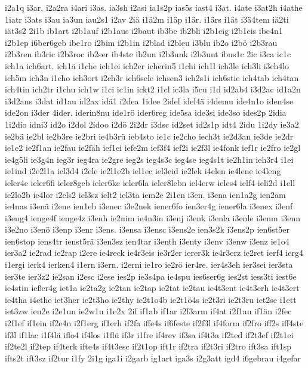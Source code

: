 {i2a1q
i3ar.
i2a2ra
i4ari
i3as.
ia3sh
i2asi
ia1s2p
ias5s
iast4
i3at.
i4ate
i3at2h
i4athe
1iatr
i3ats
i3au
ia3un
iau2s1
i2av
2iä
i1ä2m
i1äp
i1är.
i1ärs
i1ät
i3ä4tem
iä2ti
iät3s2
2i1b
ib1art
i2b1auf
i2b1aus
i2baut
ib3be
ib2bli
i2b1eig
i2b1eis
ibe4n1
i2b1ep
i6ber6geb
ibe1ro
i2bim
i2b1in
i2blad
i2bleu
i3blu
ib2o
i2bö
i2b3rau
i2b3ren
ib3ric
i2b3roc
ib2ser
ib4ste
ib2un
i2b3unk
i2b3unt
ibus1c
2ic
i3ca
ic1c
ich1a
ich6art.
ich1ä
i1che
ich1ei
ich2er
icherin5
i1chi
ich1l
ich3le
ich3li
i3ch4lo
ich5m
ich3n
i1cho
ich3ort
i2ch3r
ich6sele
ichsen3
ich2s1i
ich6stie
ich4tab
ich4tan
ich4tin
ich2tr
i1chu
ich1w
i1ci
ic1in
ickt2
i1cl
ic3la
i5cu
i1d
id2ab4
i3d2ac
id1a2n
i3d2ans
i3dat
id1au
id2ax
idä1
i2dea
1idee
2idel
idel4ä
i4demu
ide4n1o
iden4se
ide2on
i3der
4ider.
iderin8nu
ide1rö
ider6reg
ide5sa
ide3si
ide3so
ides2p
2idia
1i2dio
idni3
id2o
i2dol
2idoo
i2dö
2i2dr
i3dsc
id2set
id2s1p
idt4
2idu
1i2dy
ie3a2
ie2bä
ie2bl
ie2b3re
ie2bri
ie4b3rü
ieb4sto
ie1c
ie2cho
iech3t
ie2d3an
ie3de
ie2dr
ie1e2
ie2f1an
ie2fau
ie2fäh
ief1ei
iefe2m
ief3f4
ief2i
ie2f3l
ie4fonk
ief1r
ie2fro
ie2gl
ie4g5li
ie3g4n
ieg3r
ieg4ra
ie2gre
ieg2s
ieg4s3c
ieg4se
ieg4s1t
ie2h1in
ieh3r4
i1ei
ie1ind
i2e2l1a
iel3d4
i2ele
ie2l1e2b
iel1ec
iel3eid
ie2lek
i4elen
ie4lene
ie4leng
ieler4e
ieler6fi
ieler8geb
ieler6ke
ieler6la
ieler8lebn
iel4erw
ieles4
ielf4
ieli2d
i1ell
ie2lo2b
ie4lor
i2els2
iel3sz
ielt2
iel3ta
iem2e
2i1en
i3en.
i3ena
ien1a2g
ien2am
ie4nas
i3enä
i2ene
ien1eb
i3enec
i3e2nek
iener6fo
ien3er4g
iener6la
i3enex
i3enf
i3eng4
ienge4f
ienge4z
i3enh
ie2nim
ie4n3in
i3enj
i3enk
i3enla
i3enle
i3enm
i3enn
i3e2no
i3enö
i3enp
i3enr
i3ens.
i3ensa
i3ensc
i3ens2e
ien3s2k
i3ens2p
ien6st5er
ien6stop
iens4tr
ienst5rä
i3en3sz
ien4tar
i3enth
i3enty
i3env
i3enw
i3enz
ie1o4
ier3a2
ie2rad
ie2rap
i2ere
ie4reck
ie4r3eis
ie3r2er
ierer3k
ie4r3erz
ie2ret
ierf4
ierg4
i1ergi
ierk4
ierken4
i1ern
i3ern.
i2erni
ie1ro
ie2rö
ier4re.
ier4s3eh
ier3sei
ier3sta
ier3te
ier3z2
ie2san
i2esc
i2ese
ies2p
ie3s4pa
ie4spu
ies6ser6g
ies2st
iess3ti
iest6e
ie4stin
ießer4g
iet1a
ie2ta2g
ie2tan
ie2tap
ie2tat
ie2tau
ie4t3ent
ie4t3erh
ie4t3ert
ie4tha
i4ethe
iet3her
ie2t3ho
ie2thy
ie2t1o4b
ie2t1ö4s
ie2t3ri
ie2t3ru
iet2se
i1ett
iet3zw
ieu2e
i2e1un
ie2w1u
i1e2x
2if
if1ab
if1ar
i2f3arm
if4at
i2f1au
if1än
i2fec
i2f1ef
if1ein
if2e4n
i2f1erg
if1erh
if2fa
iffe4s
if6feste
if2f3l
if4form
if2fro
iff2s
iff4ste
if3l
if1lac
i1f4lä
iflo4
if4los
i1flü
if3r
i1fre
if4rev
if3sa
if4t3a
if2ted
if2t3ef
if2t1ei
if2te2l
if2tep
if4terk
ifte4s
if4t3esc
if2t1op
ift1r
if2tra
if2t3ri
if2tro
ift3sa
ift1sp
ifts2t
ift3sz
if2tur
i1fy
2i1g
iga1i
i2garb
ig1art
iga3s
i2g3att
igd4
i6gebrau
i4gefar
}

